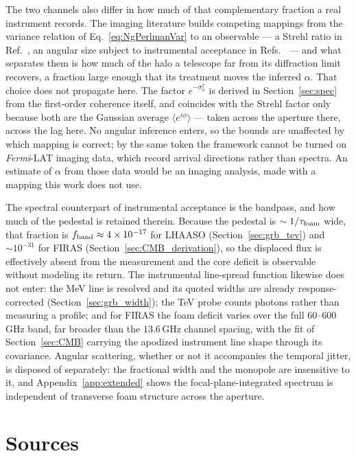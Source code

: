 \documentclass[aps,prd,onecolumn,amsmath,amssymb]{revtex4-2}
\begin{document}
The two channels also differ in how much of that complementary
fraction a real instrument records.  The imaging literature builds competing
mappings from the variance relation of Eq.~\eqref{eq:NgPerlmanVar} to an
observable --- a Strehl ratio in Ref.~\cite{NgPerlman2022}, an angular size
subject to instrumental acceptance in
Refs.~\cite{Steinbring2007,Steinbring2015,SteinbringNg2026} --- and what
separates them is how much of the halo a telescope far from its diffraction
limit recovers, a fraction large enough that its treatment moves the inferred
$\alpha$.  That choice does not propagate here.  The factor
$e^{-\sigma_\phi^2}$ is derived in Section~\ref{sec:spec} from the
first-order coherence itself, and coincides with the Strehl factor only
because both are the Gaussian average $\langle e^{i\phi}\rangle$ --- taken
across the aperture there, across the lag here.  No angular inference enters,
so the bounds are unaffected by which mapping is correct; by the same token
the framework cannot be turned on \textit{Fermi}-LAT imaging data, which
record arrival directions rather than spectra.  An estimate of $\alpha$ from
those data would be an imaging analysis, made with a mapping this work does
not use.

The spectral counterpart of instrumental acceptance is the bandpass, and how
much of the pedestal is retained therein.  Because the pedestal is
$\sim1/\tau_{\rm foam}$ wide, that fraction
is $f_{\rm band}\approx4\times10^{-17}$ for LHAASO
(Section~\ref{sec:grb_tev}) and $\sim10^{-31}$ for FIRAS
(Section~\ref{sec:CMB_derivation}), so the displaced flux is effectively absent
from the measurement and the core deficit is observable without modeling its
return.  The instrumental line-spread function likewise does not enter: the
MeV line is resolved and its quoted widths are already response-corrected
(Section~\ref{sec:grb_width}); the TeV probe counts photons rather than
measuring a profile; and for FIRAS the foam deficit varies over the full
$60$--$600$\,GHz band, far broader than the $13.6$\,GHz channel spacing, with
the fit of Section~\ref{sec:CMB} carrying the apodized instrument line shape
through its covariance.  Angular scattering, whether or not it accompanies the
temporal jitter, is disposed of separately: the fractional width and the
monopole are insensitive to it, and Appendix~\ref{app:extended} shows the
focal-plane-integrated spectrum is independent of transverse foam structure
across the aperture.

\section{Sources}
\label{sec:sources}
\end{document}
